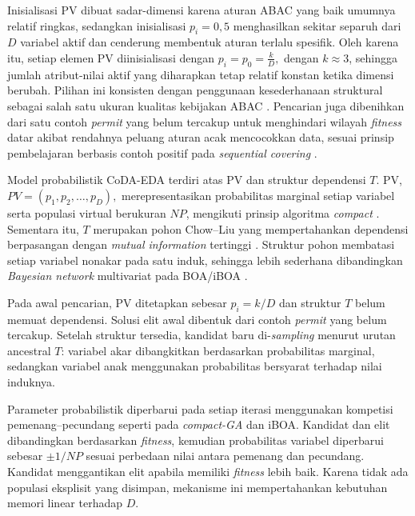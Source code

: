 Inisialisasi PV dibuat sadar-dimensi karena aturan ABAC yang baik umumnya relatif ringkas, sedangkan inisialisasi $p_i=0{,}5$\label{first:symbol-pi} menghasilkan sekitar separuh dari $D$ variabel aktif dan cenderung membentuk aturan terlalu spesifik. 
Oleh karena itu, setiap elemen PV diinisialisasi dengan
$
p_i=p_0=\frac{k}{D},
$\label{first:symbol-p0}
dengan $k\approx3$, sehingga jumlah atribut-nilai aktif yang diharapkan tetap relatif konstan ketika dimensi berubah. 
Pilihan ini konsisten dengan penggunaan kesederhanaan struktural sebagai salah satu ukuran kualitas kebijakan ABAC \parencite{perez-haro_abac_2024,quan_attribute-based_2023}. 
Pencarian juga dibenihkan dari satu contoh \textit{permit} yang belum tercakup untuk menghindari wilayah \textit{fitness} datar akibat rendahnya peluang aturan acak mencocokkan data, sesuai prinsip pembelajaran berbasis contoh positif pada \textit{sequential covering} \parencite{gudys_separate_2024}.

Model probabilistik CoDA-EDA terdiri atas PV dan struktur dependensi $T$\label{first:tgede}. PV,
$
PV=(p_1,p_2,\ldots,p_D),
$
merepresentasikan probabilitas marginal setiap variabel serta populasi virtual berukuran $NP$, mengikuti prinsip algoritma \textit{compact} \parencite{khalfi_metaheuristics_2023}. 
Sementara itu, $T$ merupakan pohon Chow–Liu yang mempertahankan dependensi berpasangan dengan \textit{mutual information} tertinggi \parencite{chow_approximating_1968}. 
Struktur pohon membatasi setiap variabel nonakar pada satu induk, sehingga lebih sederhana dibandingkan \textit{Bayesian network} multivariat pada BOA/iBOA \parencite{pelikan_iboa_2008}.

Pada awal pencarian, PV ditetapkan sebesar $p_i=k/D$ dan struktur $T$ belum memuat dependensi. 
Solusi elit awal dibentuk dari contoh \textit{permit} yang belum tercakup. 
Setelah struktur tersedia, kandidat baru di-\textit{sampling} menurut urutan ancestral $T$: variabel akar dibangkitkan berdasarkan probabilitas marginal, sedangkan variabel anak menggunakan probabilitas bersyarat terhadap nilai induknya.

Parameter probabilistik diperbarui pada setiap iterasi menggunakan kompetisi pemenang–pecundang seperti pada \textit{compact-GA} dan iBOA. 
Kandidat dan elit dibandingkan berdasarkan \textit{fitness}, kemudian probabilitas variabel diperbarui sebesar $\pm1/NP$ sesuai perbedaan nilai antara pemenang dan pecundang. 
Kandidat menggantikan elit apabila memiliki \textit{fitness} lebih baik. 
Karena tidak ada populasi eksplisit yang disimpan, mekanisme ini mempertahankan kebutuhan memori linear terhadap $D$.

